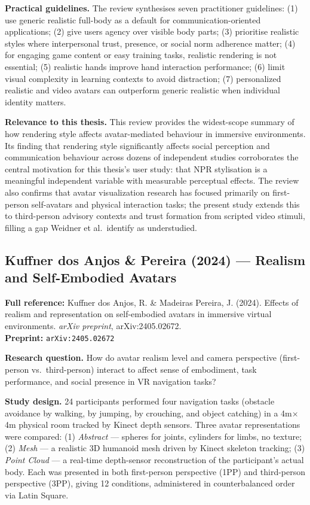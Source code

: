 \documentclass[11pt, a4paper]{article}
\begin{document}
\textbf{Practical guidelines.} The review synthesises seven practitioner guidelines: (1) use generic realistic full-body as a default for communication-oriented applications; (2) give users agency over visible body parts; (3) prioritise realistic styles where interpersonal trust, presence, or social norm adherence matter; (4) for engaging game content or easy training tasks, realistic rendering is not essential; (5) realistic hands improve hand interaction performance; (6) limit visual complexity in learning contexts to avoid distraction; (7) personalized realistic and video avatars can outperform generic realistic when individual identity matters.

\textbf{Relevance to this thesis.} This review provides the widest-scope summary of how rendering style affects avatar-mediated behaviour in immersive environments. Its finding that rendering style significantly affects social perception and communication behaviour across dozens of independent studies corroborates the central motivation for this thesis's user study: that NPR stylisation is a meaningful independent variable with measurable perceptual effects. The review also confirms that avatar visualization research has focused primarily on first-person self-avatars and physical interaction tasks; the present study extends this to third-person advisory contexts and trust formation from scripted video stimuli, filling a gap Weidner et al.\ identify as understudied.

\vspace{8pt}
\subsection{Kuffner dos Anjos \& Pereira (2024) --- Realism and Self-Embodied Avatars}

\begin{refbox}
\textbf{Full reference:} Kuffner dos Anjos, R. \& Madeiras Pereira, J. (2024). Effects of realism and representation on self-embodied avatars in immersive virtual environments. \textit{arXiv preprint}, arXiv:2405.02672.\\[4pt]
\textbf{Preprint:} \texttt{arXiv:2405.02672}
\end{refbox}

\textbf{Research question.} How do avatar realism level and camera perspective (first-person vs.\ third-person) interact to affect sense of embodiment, task performance, and social presence in VR navigation tasks?

\textbf{Study design.} 24 participants performed four navigation tasks (obstacle avoidance by walking, by jumping, by crouching, and object catching) in a 4m$\times$4m physical room tracked by Kinect depth sensors. Three avatar representations were compared: (1) \textit{Abstract} --- spheres for joints, cylinders for limbs, no texture; (2) \textit{Mesh} --- a realistic 3D humanoid mesh driven by Kinect skeleton tracking; (3) \textit{Point Cloud} --- a real-time depth-sensor reconstruction of the participant's actual body. Each was presented in both first-person perspective (1PP) and third-person perspective (3PP), giving 12 conditions, administered in counterbalanced order via Latin Square.
\end{document}
